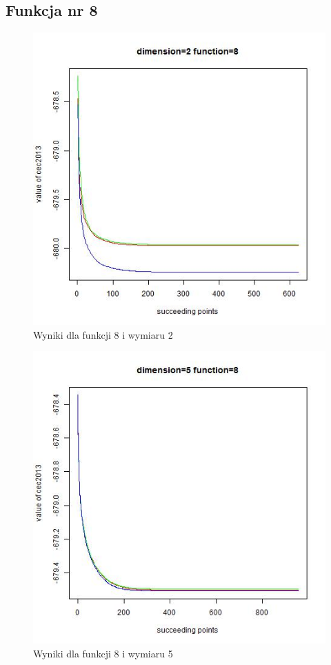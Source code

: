 \documentclass{article}
\begin{document}
\subsection{Funkcja nr 8}


\begin{figure}[H]
\centering
\includegraphics[scale=0.6]{dim_2__func_8}
\caption{Wyniki dla funkcji 8 i wymiaru 2}
\end{figure}

\begin{figure}[H]
\centering
\includegraphics[scale=0.6]{dim_5__func_8}
\caption{Wyniki dla funkcji 8 i wymiaru 5}
\end{figure}
\end{document}
